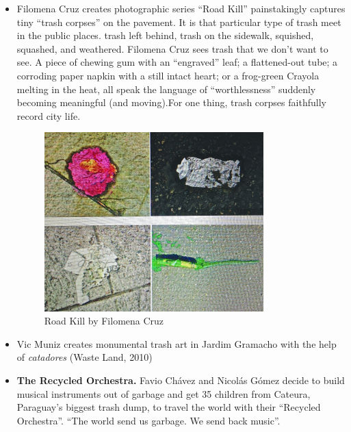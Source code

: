 \begin{itemize}
\item Filomena Cruz creates photographic series “Road Kill” painstakingly captures tiny “trash corpses” on the pavement. It is that particular type of trash meet in the public places. trash left behind, trash on the sidewalk, squished, squashed, and weathered. Filomena Cruz sees trash that we don’t want to see. A
piece of chewing gum with an “engraved” leaf; a flattened-out tube; a corroding paper napkin with a still intact heart; or a frog-green Crayola melting in the heat, all speak the language of “worthlessness” suddenly becoming meaningful (and moving).For one thing, trash corpses faithfully record city life. 
  \begin{figure}[ht]
      \centering
      \includegraphics[width=0.8\textwidth]{graphics/FilomenaCruz_RoadKill_ReVista.jpg}
      \caption{Road Kill by Filomena Cruz}
      \label{fig:FilomenaCruz_RoadKill_ReVista}
  \end{figure}

\item Vic Muniz creates monumental trash art in Jardim Gramacho with the help of \textit{catadores} (Waste Land, 2010)

\item \textbf{The Recycled Orchestra.} Favio Chávez and Nicolás Gómez decide to build musical instruments out of garbage and get 35 children from Cateura, Paraguay’s biggest trash dump, to travel the world with their “Recycled Orchestra”. ``The world send us garbage. We send back music''.


\end{itemize}
